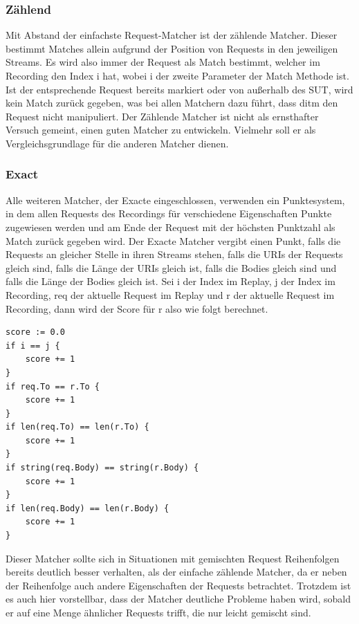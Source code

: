 \documentclass[12pt,a4paper]{report}
\begin{document}
\subsubsection{Zählend}
Mit Abstand der einfachste Request-Matcher ist der zählende Matcher. Dieser bestimmt Matches allein aufgrund der Position
von Requests in den jeweiligen Streams. Es wird also immer der Request als Match bestimmt, welcher im Recording den Index i hat,
wobei i der zweite Parameter der Match Methode ist. Ist der entsprechende Request bereits markiert oder von außerhalb des SUT,
wird kein Match zurück gegeben, was bei allen Matchern dazu führt, dass ditm den Request nicht manipuliert.
Der Zählende Matcher ist nicht als ernsthafter Versuch gemeint, einen guten Matcher zu entwickeln. Vielmehr soll
er als Vergleichsgrundlage für die anderen Matcher dienen.
\subsubsection{Exact}
Alle weiteren Matcher, der Exacte eingeschlossen, verwenden ein Punktesystem, in dem allen Requests des Recordings für verschiedene
Eigenschaften Punkte zugewiesen werden und am Ende der Request mit der höchsten Punktzahl als Match zurück gegeben wird.
Der Exacte Matcher vergibt einen Punkt, falls die Requests an gleicher Stelle in ihren Streams stehen, falls die URIs der
Requests gleich sind, falls die Länge der URIs gleich ist, falls die Bodies gleich sind und falls die Länge der Bodies gleich ist.
Sei i der Index im Replay, j der Index im Recording, req der aktuelle Request im Replay und r der aktuelle
Request im Recording, dann wird der Score für r also wie folgt berechnet.
\begin{verbatim}
score := 0.0
if i == j {
    score += 1
}
if req.To == r.To {
    score += 1
}
if len(req.To) == len(r.To) {
    score += 1
}
if string(req.Body) == string(r.Body) {
    score += 1
}
if len(req.Body) == len(r.Body) {
    score += 1
}
\end{verbatim}
Dieser Matcher sollte sich in Situationen mit gemischten Request Reihenfolgen bereits deutlich besser verhalten, als der
einfache zählende Matcher, da er neben der Reihenfolge auch andere Eigenschaften der Requests betrachtet. Trotzdem ist es auch
hier vorstellbar, dass der Matcher deutliche Probleme haben wird, sobald er auf eine Menge ähnlicher Requests trifft, die nur
leicht gemischt sind.
\end{document}
